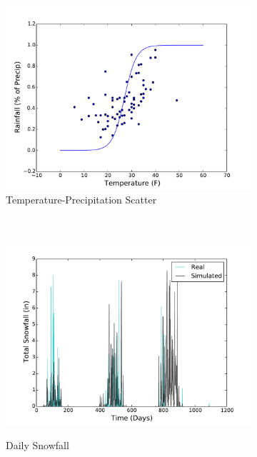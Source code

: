 \documentclass[11pt, letterpaper]{article}
\begin{document}
\begin{figure}[H]
\begin{subfigure}[b]{0.45\textwidth}
  \end{subfigure}
  ~
  \begin{subfigure}[b]{0.45\textwidth}
    \includegraphics[width=\textwidth]{figures/daily_temp_precip_scatter.pdf}
    \caption{Temperature-Precipitation Scatter}
  \end{subfigure}
  ~
  \begin{subfigure}[b]{0.45\textwidth}
    \includegraphics[width=\textwidth]{figures/daily_snowfall.pdf}
    \label{fig:analysis-raw}
    \caption{Daily Snowfall}
  \end{subfigure}
  ~
  \begin{subfigure}[b]{0.45\textwidth}

\end{subfigure}
\end{figure}
\end{document}
